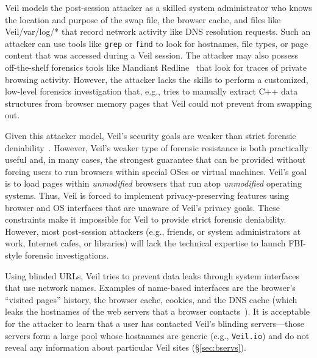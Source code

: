 Veil models the post-session attacker as a skilled
system administrator who knows the location and purpose
of the swap file, the browser cache, and files like
Veil{/var/log/*} that record network activity
like DNS resolution requests. Such an attacker can
use tools like \texttt{grep} or \texttt{find} to
look for hostnames, file types, or page content that
was accessed during a Veil session. The attacker
may also possess off-the-shelf forensics tools like
Mandiant Redline~\cite{mandiant} that look for traces
of private browsing activity. However, the attacker
lacks the skills to perform a customized, low-level
forensics investigation that, e.g., tries to manually
extract C++ data structures from browser memory
pages that Veil could not prevent from swapping out.

Given this attacker model, Veil's security goals are
weaker than strict forensic deniability~\cite{lacuna}.
However, Veil's weaker type of forensic resistance
is both practically useful and, in many cases, the
strongest guarantee that can be provided without
forcing users to run browsers within special OSes or
virtual machines. Veil's goal is to load pages within
\textit{unmodified} browsers that run atop
\textit{unmodified} operating systems. Thus, Veil
is forced to implement privacy-preserving features
using browser and OS interfaces that are unaware of
Veil's privacy goals. These constraints make it
impossible for Veil to provide strict forensic
deniability. However, most post-session attackers
(e.g., friends, or system administrators at work,
Internet cafes, or libraries) will
lack the technical expertise to launch FBI-style
forensic investigations.


Using blinded URLs, Veil tries to prevent data leaks
through system interfaces that use network names.
Examples of name-based interfaces are the browser's ``visited pages''
history, the browser cache, cookies, and the DNS
cache (which leaks the hostnames of the web servers
that a browser contacts~\cite{aggarwal10}). It is
acceptable for the attacker to learn that a user
has contacted Veil's blinding servers---those
servers form a large pool whose hostnames are generic
(e.g., \texttt{Veil.io}) and do not reveal
any information about particular Veil sites
(\S\ref{sec:bservs}).


